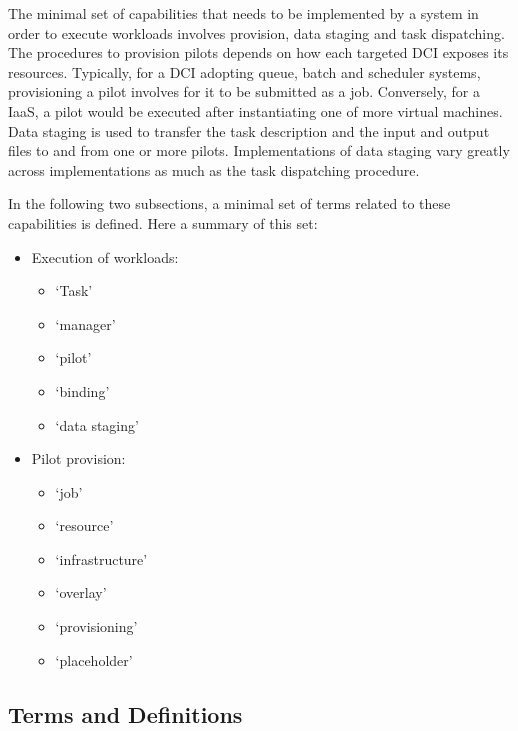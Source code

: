 \documentclass{sig-alternate}
\begin{document}
The minimal set of capabilities that needs to be implemented by a \pilotjob
system in order to execute workloads involves \pilot provision, data staging
and task dispatching.  The procedures to 
provision pilots depends on how each
targeted DCI exposes its resources. Typically, for a DCI adopting queue, batch
and scheduler systems, provisioning a pilot involves for it to be submitted as
a job. Conversely, for a IaaS, a pilot would be executed after instantiating
one of more virtual machines. Data staging is used to transfer the task
description and the input and output files to and from one or more pilots.
Implementations of data staging vary greatly across \pilotjob implementations
as much as the task dispatching procedure.

In the following two subsections, a minimal set of terms related to these capabilities is defined. Here a summary of this set:

\begin{itemize}
  \item Execution of workloads:
  \begin{itemize}
    \item `Task'
    \item `manager'
    \item `pilot'
    \item `binding'
    \item `data staging'
  \end{itemize}
  \item Pilot provision:
  \begin{itemize}
    \item `job'
    \item `resource'
    \item `infrastructure'
    \item `overlay'
    \item `provisioning'
    \item `placeholder'
  \end{itemize}
\end{itemize}

\subsection{Terms and Definitions}
\end{document}
